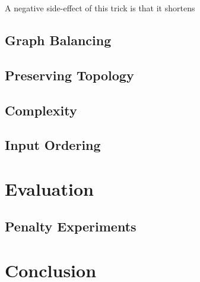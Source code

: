 \documentclass{sig-alternate-sigmod09}
\begin{document}
A negative side-effect of this trick is that it shortens 

\subsection{Graph Balancing}
\label{SEC:balancing}

\subsection{Preserving Topology}

\subsection{Complexity}

\subsection{Input Ordering}



\section{Evaluation}

\subsection{Penalty Experiments}

\section{Conclusion}

\balancecolumns
\end{document}
